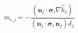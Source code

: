 $$
m_{i,j} = - \frac{\left(\mathbf n_j\cdot \boldsymbol\sigma_i\nabla\hat h_i\right)}{\left(\mathbf n_j\cdot \boldsymbol\sigma_i\,\mathbf n_j\right) d_j}
$$
